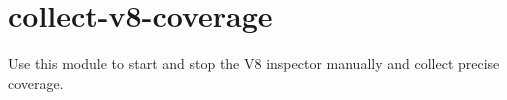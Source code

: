 \chapter{collect-\/v8-\/coverage}
\hypertarget{md_pkiclassroomrescheduler_2src_2main_2frontend_2node__modules_2collect-v8-coverage_2_r_e_a_d_m_e}{}\label{md_pkiclassroomrescheduler_2src_2main_2frontend_2node__modules_2collect-v8-coverage_2_r_e_a_d_m_e}
\label{md_pkiclassroomrescheduler_2src_2main_2frontend_2node__modules_2collect-v8-coverage_2_r_e_a_d_m_e_autotoc_md7191}%
%
 Use this module to start and stop the V8 inspector manually and collect precise coverage.


\begin{DoxyCode}{0}
\DoxyCodeLine{}
\DoxyCodeLine{}
\DoxyCodeLine{}
\DoxyCodeLine{}

\end{DoxyCode}
 